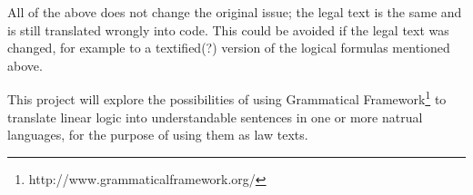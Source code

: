 All of the above does not change the original issue; the legal text is the same and is still translated wrongly into code. This could be avoided if the legal text was changed, for example to a textified(?) version of the logical formulas mentioned above.

This project will explore the possibilities of using Grammatical Framework\footnote{http://www.grammaticalframework.org/} to translate linear logic into understandable sentences in one or more natrual languages, for the purpose of using them as law texts.

